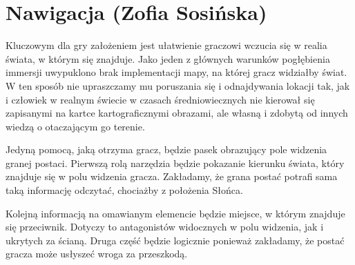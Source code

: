 \section{Nawigacja (Zofia Sosińska)}\label{chap:naw}

Kluczowym dla gry założeniem jest ułatwienie graczowi wczucia się w realia świata, w którym się znajduje. 
Jako jeden z głównych warunków pogłębienia immersji uwypuklono brak implementacji mapy, na której gracz widziałby świat. 
W ten sposób nie upraszczamy mu poruszania się i odnajdywania lokacji tak,
jak i człowiek w realnym świecie w czasach średniowiecznych nie kierował się zapisanymi na kartce kartograficznymi obrazami, 
ale własną i zdobytą od innych wiedzą o otaczającym go terenie. 

Jedyną pomocą, jaką otrzyma gracz, będzie pasek obrazujący pole widzenia granej postaci.
Pierwszą rolą narzędzia będzie pokazanie kierunku świata, który znajduje się w polu widzenia gracza.
Zakładamy, że grana postać potrafi sama taką informację odczytać, chociażby z położenia Słońca.

Kolejną informacją na omawianym elemencie będzie miejsce, w którym znajduje się przeciwnik. 
Dotyczy to antagonistów widocznych w polu widzenia, jak i ukrytych za ścianą. 
Druga część będzie logicznie ponieważ zakładamy, że postać gracza może usłyszeć 
wroga za przeszkodą.

